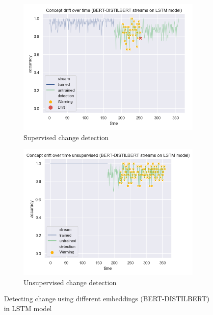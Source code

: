 \documentclass[12pt]{report}
\begin{document}
\begin{figure}[H]
\centering
\begin{subfigure}{.5\textwidth}
  \centering
  \includegraphics[width=\linewidth]{assets/detecting-change/diff_embed_lstm_wos_1_BERT_DISTILBERT.png}
  \caption{Supervised change detection}
  \label{fig:lstm-diff-embed-super-B-D}
\end{subfigure}%
\begin{subfigure}{.5\textwidth}
  \centering
  \includegraphics[width=\linewidth]{assets/detecting-change/diff_embed_lstm_wos_1_BERT_DISTILBERT_unsupervised.png}
  \caption{Unsupervised change detection}
  \label{fig:lstm-diff-embed-unsuper-B-D}
\end{subfigure}
\caption{Detecting change using different embeddings (BERT-DISTILBERT) in LSTM model}
\label{fig:lstm-diff-embed-B-D}
\end{figure}
\end{document}
